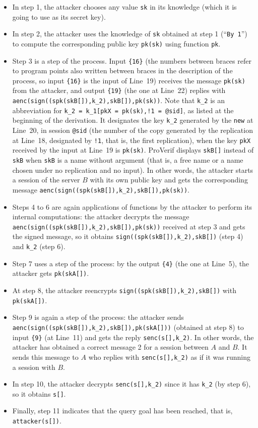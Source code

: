 \documentclass{book}
\begin{document}
\begin{itemize}
\item In step 1, the attacker chooses any value \lstinline!sk! in its knowledge (which it is going to use as its secret key).
\item In step 2, the attacker uses the knowledge of \lstinline!sk! obtained at step 1 (``\lstinline!By 1!'') to compute the corresponding public key \lstinline!pk(sk)! using function \lstinline!pk!.
\item Step 3 is a step of the process. Input \lstinline!{16}! (the numbers between braces refer to program points also written between braces in the description of the process, so input \lstinline!{16}! is the input of Line~19) receives the message \lstinline!pk(sk)! from the attacker, and output \lstinline!{19}! (the one at Line~22) replies with \lstinline!aenc(sign((spk(skB[]),k_2),skB[]),pk(sk))!. Note that \lstinline!k_2! is an abbreviation for \lstinline{k_2 = k_1[pkX = pk(sk),!1 = @sid]}, as listed at the beginning of the derivation. It designates the key \lstinline!k_2! generated by the \lstinline!new! at Line~20, in session \lstinline!@sid! (the number of the copy generated by the replication at Line~18, designated by \lstinline{!1}, that is, the first replication), when the key \lstinline!pkX! received by the input at Line~19 is \lstinline!pk(sk)!. ProVerif displays \lstinline!skB[]! instead of \lstinline!skB! when \lstinline!skB! is a name without argument (that is, a free name or a name chosen under no replication and no input). In other words, the attacker starts a session of the server $B$ with its own public key and gets the corresponding message \lstinline!aenc(sign((spk(skB[]),k_2),skB[]),pk(sk))!.
\item Steps 4 to 6 are again applications of functions by the attacker to perform its internal computations: the attacker decrypts the message
\lstinline!aenc(sign((spk(skB[]),k_2),skB[]),pk(sk))! received at step 3 and gets the signed message, so it obtains
\lstinline!sign((spk(skB[]),k_2),skB[])! (step 4) and \lstinline!k_2! (step 6).
\item Step 7 uses a step of the process: by the output \lstinline!{4}! (the one at Line~5), the attacker gets \lstinline!pk(skA[])!.
\item At step 8, the attacker reencrypts \lstinline!sign((spk(skB[]),k_2),skB[])! with \lstinline!pk(skA[])!.
\item Step 9 is again a step of the process: the attacker sends \lstinline!aenc(sign((spk(skB[]),k_2),skB[]),pk(skA[]))! (obtained at step 8) to input \lstinline!{9}! (at Line~11) and gets the reply \lstinline!senc(s[],k_2)!. In other words, the attacker has obtained a correct message 2 for a session between $A$ and $B$. It sends this message to $A$ who replies with \lstinline!senc(s[],k_2)! as if it was running a session with $B$.
\item In step 10, the attacker decrypts \lstinline!senc(s[],k_2)! since it has \lstinline!k_2! (by step 6), so it obtains \lstinline!s[]!.
\item Finally, step 11 indicates that the query goal has been reached, that is, \lstinline!attacker(s[])!.
\end{itemize}
\end{document}
